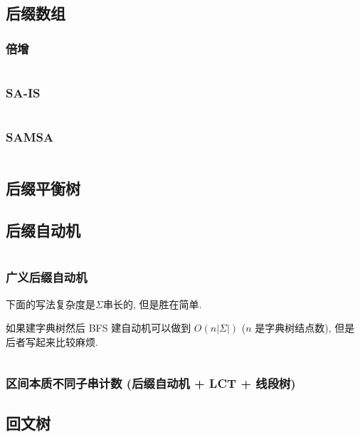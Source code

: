 \documentclass[a4paper, twoside]{article}
\begin{document}
\begin{multicols}{2}
			\subsection{后缀数组}
				\subsubsection{倍增}
					\inputminted{cpp}{../src/string/sa.cpp}	

				\subsubsection{SA-IS}
					\inputminted{cpp}{../src/string/sais.cpp}
			
				\subsubsection{SAMSA}
				 	\inputminted{cpp}{../src/string/SAMSA.cpp}

			\subsection{后缀平衡树}
				

			\subsection{后缀自动机}
				\inputminted{cpp}{../src/string/后缀自动机.cpp}

				\subsubsection{广义后缀自动机}
				下面的写法复杂度是$\Sigma$串长的, 但是胜在简单.
				
				如果建字典树然后 BFS 建自动机可以做到 $O\left(n\left|\Sigma\right|\right)$ ($n$ 是字典树结点数), 但是后者写起来比较麻烦.
				\inputminted{cpp}{../src/string/广义后缀自动机.cpp}

				\subsubsection[区间本质不同子串计数]{区间本质不同子串计数 (后缀自动机 + LCT + 线段树)}
					

			\subsection{回文树}
				\inputminted{cpp}{../src/string/回文树.cpp}


\end{multicols}
\end{document}
